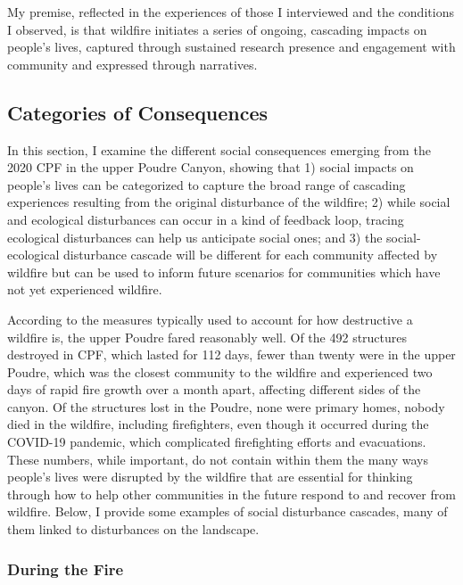 \documentclass[
]{article}
\begin{document}
My premise, reflected in the experiences of those I interviewed and the conditions I observed, is that wildfire initiates a series of ongoing, cascading impacts on people's lives, captured through sustained research presence and engagement with community and expressed through narratives.

\subsection{Categories of Consequences}\label{categories-of-consequences-1}

In this section, I examine the different social consequences emerging from the 2020 CPF in the upper Poudre Canyon, showing that 1) social impacts on people's lives can be categorized to capture the broad range of cascading experiences resulting from the original disturbance of the wildfire; 2) while social and ecological disturbances can occur in a kind of feedback loop, tracing ecological disturbances can help us anticipate social ones; and 3) the social-ecological disturbance cascade will be different for each community affected by wildfire but can be used to inform future scenarios for communities which have not yet experienced wildfire.

According to the measures typically used to account for how destructive a wildfire is, the upper Poudre fared reasonably well. Of the 492 structures destroyed in CPF, which lasted for 112 days, fewer than twenty were in the upper Poudre, which was the closest community to the wildfire and experienced two days of rapid fire growth over a month apart, affecting different sides of the canyon. Of the structures lost in the Poudre, none were primary homes, nobody died in the wildfire, including firefighters, even though it occurred during the COVID-19 pandemic, which complicated firefighting efforts and evacuations. These numbers, while important, do not contain within them the many ways people's lives were disrupted by the wildfire that are essential for thinking through how to help other communities in the future respond to and recover from wildfire. Below, I provide some examples of social disturbance cascades, many of them linked to disturbances on the landscape.

\subsubsection{During the Fire}\label{during-the-fire-1}
\end{document}
